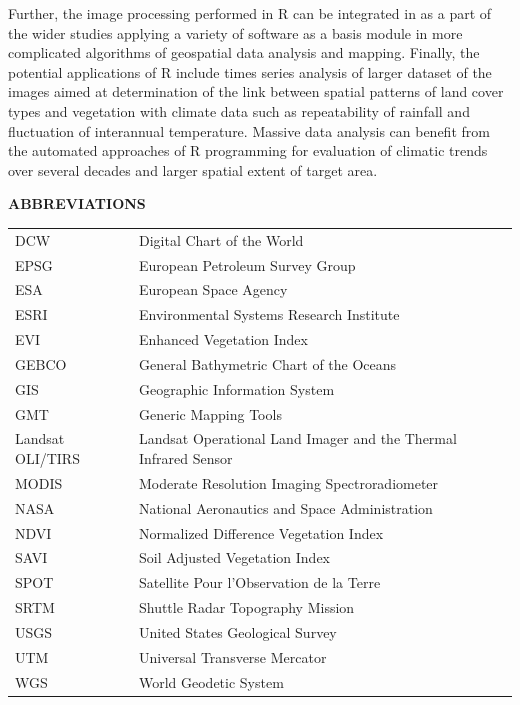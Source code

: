 \documentclass[12pt,a4paper,oneside]{article}
\def \newsection{\vspace{12pt}\textbf}
\def \newpar{\vspace{6pt}}
\begin{document}
\newpar Further, the image processing performed in R can be integrated in as a part of the wider studies applying a variety of software as a basis module in more complicated algorithms of geospatial data analysis and mapping. Finally, the potential applications of R include times series analysis of larger dataset of the images aimed at determination of the link between spatial patterns of land cover types and vegetation with climate data such as repeatability of rainfall and fluctuation of interannual temperature. Massive data analysis can benefit from the automated approaches of R programming for evaluation of climatic trends over several decades and larger spatial extent of target area.

\vspace{12pt}

\newsection {ABBREVIATIONS}
\vspace{12pt}

\begin{tabular}{@{}ll}
DCW & Digital Chart of the World \\
EPSG & European Petroleum Survey Group \\
ESA & European Space Agency \\
ESRI & Environmental Systems Research Institute \\
EVI & Enhanced Vegetation Index \\
GEBCO & General Bathymetric Chart of the Oceans \\
GIS & Geographic Information System \\
GMT & Generic Mapping Tools \\
Landsat OLI/TIRS & Landsat Operational Land Imager and the Thermal Infrared Sensor \\
MODIS & Moderate Resolution Imaging Spectroradiometer \\
NASA & National Aeronautics and Space Administration \\
NDVI & Normalized Difference Vegetation Index \\
SAVI & Soil Adjusted Vegetation Index \\
SPOT & Satellite Pour l'Observation de la Terre \\
SRTM & Shuttle Radar Topography Mission \\
USGS & United States Geological Survey \\
UTM & Universal Transverse Mercator \\
WGS & World Geodetic System \\
\end{tabular}
\end{document}
